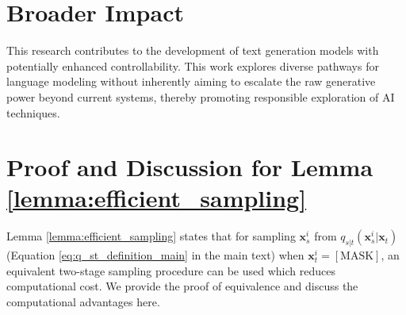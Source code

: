 \section{Broader Impact}
This research contributes to the development of text generation models with potentially enhanced controllability. This work explores diverse pathways for language modeling without inherently aiming to escalate the raw generative power beyond current systems, thereby promoting responsible exploration of AI techniques.


\section{Proof and Discussion for Lemma \ref{lemma:efficient_sampling}} \label{appendix:proof_lemma1}

Lemma \ref{lemma:efficient_sampling} states that for sampling $\boldsymbol{x}_s^i$ from $q_{s|t}(\boldsymbol{x}_s^i|\boldsymbol{x}_t)$ (Equation \eqref{eq:q_st_definition_main} in the main text) when $\boldsymbol{x}_t^i = [\text{MASK}]$, an equivalent two-stage sampling procedure can be used which reduces computational cost. We provide the proof of equivalence and discuss the computational advantages here.

